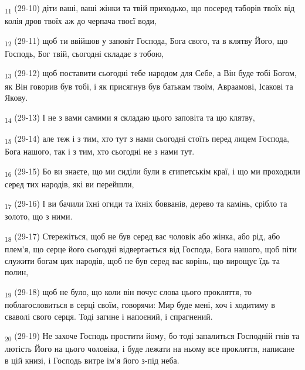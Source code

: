 \begin{tcolorbox}
\textsubscript{11} (29-10) діти ваші, ваші жінки та твій приходько, що посеред таборів твоїх від колія дров твоїх аж до черпача твоєї води,
\end{tcolorbox}
\begin{tcolorbox}
\textsubscript{12} (29-11) щоб ти ввійшов у заповіт Господа, Бога свого, та в клятву Його, що Господь, Бог твій, сьогодні складає з тобою,
\end{tcolorbox}
\begin{tcolorbox}
\textsubscript{13} (29-12) щоб поставити сьогодні тебе народом для Себе, а Він буде тобі Богом, як Він говорив був тобі, і як присягнув був батькам твоїм, Авраамові, Ісакові та Якову.
\end{tcolorbox}
\begin{tcolorbox}
\textsubscript{14} (29-13) І не з вами самими я складаю цього заповіта та цю клятву,
\end{tcolorbox}
\begin{tcolorbox}
\textsubscript{15} (29-14) але теж і з тим, хто тут з нами сьогодні стоїть перед лицем Господа, Бога нашого, так і з тим, хто сьогодні не з нами тут.
\end{tcolorbox}
\begin{tcolorbox}
\textsubscript{16} (29-15) Бо ви знаєте, що ми сиділи були в єгипетськім краї, і що ми проходили серед тих народів, які ви перейшли,
\end{tcolorbox}
\begin{tcolorbox}
\textsubscript{17} (29-16) І ви бачили їхні огиди та їхніх бовванів, дерево та камінь, срібло та золото, що з ними.
\end{tcolorbox}
\begin{tcolorbox}
\textsubscript{18} (29-17) Стережіться, щоб не був серед вас чоловік або жінка, або рід, або плем'я, що серце його сьогодні відвертається від Господа, Бога нашого, щоб піти служити богам цих народів, щоб не був серед вас корінь, що вирощує їдь та полин,
\end{tcolorbox}
\begin{tcolorbox}
\textsubscript{19} (29-18) щоб не було, що коли він почує слова цього прокляття, то поблагословиться в серці своїм, говорячи: Мир буде мені, хоч і ходитиму в сваволі свого серця. Тоді загине і напоєний, і спрагнений.
\end{tcolorbox}
\begin{tcolorbox}
\textsubscript{20} (29-19) Не захоче Господь простити йому, бо тоді запалиться Господній гнів та лютість Його на цього чоловіка, і буде лежати на ньому все прокляття, написане в цій книзі, і Господь витре ім'я його з-під неба.
\end{tcolorbox}
